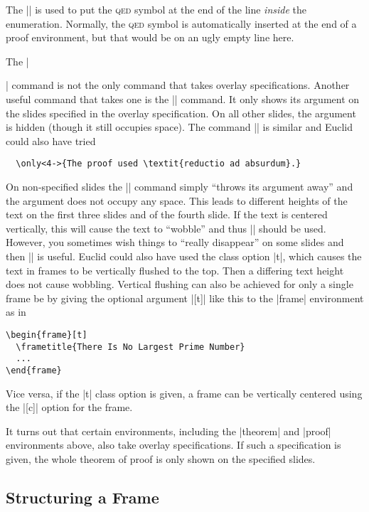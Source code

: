 The |\qedhere| is used to put the \textsc{qed} symbol at the end of
the line \emph{inside} the enumeration. Normally, the \textsc{qed}
symbol is automatically inserted at the end of a proof environment,
but that would be on an ugly empty line here.

The |\item| command is not the only command that takes overlay
specifications. Another useful command that takes one is the
|\uncover| command. It only shows its argument on the slides specified 
in the overlay specification. On all other slides, the argument is
hidden (though it still occupies space). The command |\only| is
similar and Euclid could also have tried
\begin{verbatim}
  \only<4->{The proof used \textit{reductio ad absurdum}.}
\end{verbatim}
On non-specified slides the |\only| command simply ``throws its
argument away'' and the argument does not occupy any space. This leads
to different heights of the text on the first three slides and of the
fourth slide. If the text is centered vertically, this will cause the
text to ``wobble'' and thus |\uncover| should be used. However, you
sometimes wish things to ``really disappear'' on some slides and then
|\only| is useful. Euclid could also have used the class option
|t|, which causes the text in frames to be vertically flushed
to the top. Then a differing text height does not cause
wobbling. Vertical flushing can also be achieved for only a single
frame be by giving the optional argument |[t]| like this to the
|frame| environment as in 
\begin{verbatim}
\begin{frame}[t]
  \frametitle{There Is No Largest Prime Number}
  ...
\end{frame}
\end{verbatim}
Vice versa, if the |t| class option is given, a frame can be
vertically centered using the |[c]| option for the frame.

It turns out that certain environments, including the |theorem| and
|proof| environments above, also take overlay specifications. If such
a specification is given, the whole theorem of proof is only shown on
the specified slides.


\subsection{Structuring a Frame}


